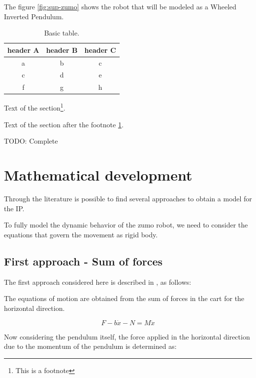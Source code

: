 \documentclass{article}
\begin{document}
The figure \ref{fig:sup-zumo} shows the robot that will be modeled as a Wheeled Inverted Pendulum.

\begin{table}[h!]
	\centering
	\caption{Basic table.}
	\label{tab:tab1}
	\begin{tabular}{ccc}

		\toprule

		header A & header B & header C\\

		\midrule

		a & b & c\\
		c & d & e\\
		f & g & h\\

		\bottomrule

	\end{tabular}
\end{table}

Text of the section\footnote{\label{fn1}This is a footnote}.

Text of the section after the footnote \ref{fn1}.

TODO: Complete

\section{Mathematical development}

Through the literature is possible to find several approaches to obtain a model for the IP.

To fully model the dynamic behavior of the zumo robot, we need to consider the equations that govern the movement as rigid body.

\subsection{First approach - Sum of forces}

The first approach considered here is described in \cite{SUL03}, as follows:

The equations of motion are obtained from the sum of forces in the cart for the horizontal direction.

\begin{equation} \label{sfch}
F-b\dot{x}-N=M\ddot{x}
\end{equation}

Now considering the pendulum itself, the force applied in the horizontal direction due to the momentum of the pendulum is determined as:
\end{document}
